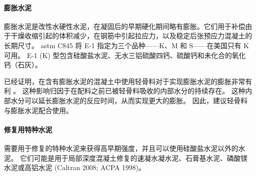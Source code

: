 \paragraph{膨胀水泥}
膨胀水泥是改性水硬性水泥，在凝固后的早期硬化期间略有膨胀。它们用于补偿由于干燥收缩引起的体积减少，在钢筋中引起拉应力，以及稳定后张预应力混凝土的长期尺寸。 \acrshort*{astm} C845 将 E-1 指定为三个品种——K、M 和 S——在美国只有 K 可用。 E-1 (K) 型包含硅酸盐水泥、无水三铝硫酸四钙、硫酸钙和未化合的氧化钙（石灰）。

已经证明，在含有膨胀水泥的混凝土中使用轻骨料对于实现膨胀水泥的膨胀非常有利 \cite{russell1978p}。 这种影响归因于在配料之前已被轻骨料吸收的内部水分的持续存在。 这种内部水分可以延长膨胀水泥的反应时间，从而实现更大的膨胀。 因此，建议轻骨料与膨胀水泥配合使用。

\paragraph{修复用特种水泥}
需要用于修复的特种水泥来获得高早期强度，并且可以使用硅酸盐水泥以外的水泥。 它们可能是用于局部深度混凝土修复的速凝水凝水泥、石膏基水泥、磷酸镁水泥或高铝水泥 (Caltran 2008; ACPA 1998)。

